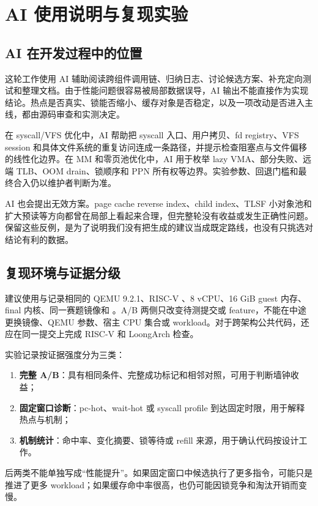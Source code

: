 \chapter{AI 使用说明与复现实验}

\section{AI 在开发过程中的位置}

这轮工作使用 AI 辅助阅读跨组件调用链、归纳日志、讨论候选方案、补充定向测试和整理文档。由于性能问题很容易被局部数据误导，AI 输出不能直接作为实现结论。热点是否真实、锁能否缩小、缓存对象是否稳定，以及一项改动是否进入主线，都由源码审查和实测决定。

在 syscall/VFS 优化中，AI 帮助把 syscall 入口、用户拷贝、fd registry、VFS session 和具体文件系统的重复访问连成一条路径，并提示检查阻塞点与文件偏移的线性化边界。在 MM 和零页池优化中，AI 用于枚举 lazy VMA、部分失败、远端 TLB、OOM drain、锁顺序和 PPN 所有权等边界。实验参数、回退门槛和最终合入仍以维护者判断为准。

AI 也会提出无效方案。page cache reverse index、child index、TLSF 小对象池和扩大预读等方向都曾在局部上看起来合理，但完整轮没有收益或发生正确性问题。保留这些反例，是为了说明我们没有把生成的建议当成既定路线，也没有只挑选对结论有利的数据。

\section{复现环境与证据分级}

建议使用与记录相同的 QEMU 9.2.1、RISC-V 、8 vCPU、16 GiB guest 内存、final 内核、同一赛题镜像和 。A/B 两侧只改变待测提交或 feature，不能在中途更换镜像、QEMU 参数、宿主 CPU 集合或 workload。对于跨架构公共代码，还应在同一提交上完成 RISC-V 和 LoongArch 检查。

实验记录按证据强度分为三类：

\begin{enumerate}
  \item \textbf{完整 A/B}：具有相同条件、完整成功标记和相邻对照，可用于判断墙钟收益；
  \item \textbf{固定窗口诊断}：pc-hot、wait-hot 或 syscall profile 到达固定时限，用于解释热点与机制；
  \item \textbf{机制统计}：命中率、变化摘要、锁等待或 refill 来源，用于确认代码按设计工作。
\end{enumerate}

后两类不能单独写成“性能提升”。如果固定窗口中候选执行了更多指令，可能只是推进了更多 workload；如果缓存命中率很高，也仍可能因锁竞争和淘汰开销而变慢。

